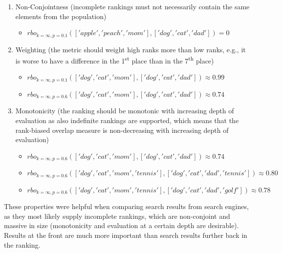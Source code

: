 \documentclass[draft,final]{thesisclass} %
\begin{document}
\begin{enumerate}
\item Non-Conjointness (incomplete rankings must not necessarily contain the same elements from the population)
\begin{itemize}
    \item $rbo_{k=\infty,p=0.1}(['apple','peach','mom'],['dog','cat','dad']) = 0$
\end{itemize}
\item Weighting (the metric should weight high ranks more than low ranks, e.g., it is worse to have a difference in the 1\textsuperscript{st} place than in the 7\textsuperscript{th} place)
\begin{itemize}
    \item $rbo_{k=\infty,p=0.1}(['dog','cat','mom'],['dog','cat','dad']) \approx 0.99$
    \item $rbo_{k=\infty,p=0.6}(['dog','cat','mom'],['dog','cat','dad']) \approx 0.74$
\end{itemize}
\item Monotonicity (the ranking should be monotonic with increasing depth of evaluation as also indefinite rankings are supported, which means that the rank-biased overlap measure is non-decreasing with increasing depth of evaluation)
\begin{itemize}
    \item $rbo_{k=\infty,p=0.6}(['dog','cat','mom'],['dog','cat','dad']) \approx 0.74$
    \item $rbo_{k=\infty,p=0.6}(['dog','cat','mom','tennis'],['dog','cat','dad','tennis']) \approx 0.80$
    \item $rbo_{k=\infty,p=0.6}(['dog','cat','mom','tennis'],['dog','cat','dad','golf']) \approx 0.78$
\end{itemize}
\end{enumerate}
These properties were helpful when comparing search results from search engines, as they most likely supply incomplete rankings, which are non-conjoint and massive in size (monotonicity and evaluation at a certain depth are desirable). Results at the front are much more important than search results further back in the ranking.
\end{document}
